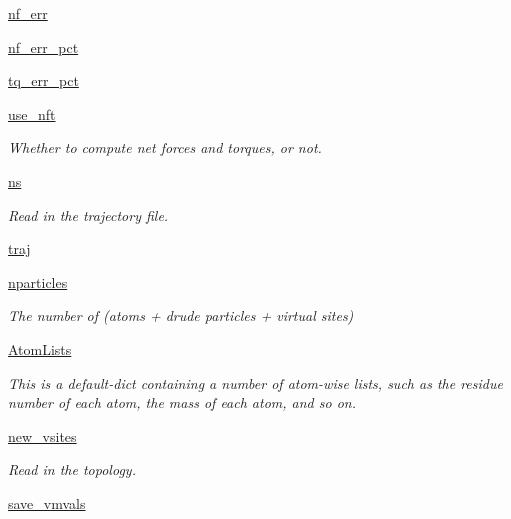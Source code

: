 \begin{DoxyCompactItemize}
\hyperlink{classforcebalance_1_1abinitio_1_1AbInitio_a89de620e9aa500481c9e1ded99e14f72}{nf\-\_\-err}
\item 
\hyperlink{classforcebalance_1_1abinitio_1_1AbInitio_a184edac2cb27a999c363595ea59d8163}{nf\-\_\-err\-\_\-pct}
\item 
\hyperlink{classforcebalance_1_1abinitio_1_1AbInitio_a184f2a783b2710f6f75842afdeccf14e}{tq\-\_\-err\-\_\-pct}
\item 
\hyperlink{classforcebalance_1_1abinitio_1_1AbInitio_afd8d179560a295ffa6c6309843c59279}{use\-\_\-nft}
\begin{DoxyCompactList}\small\item\em Whether to compute net forces and torques, or not. \end{DoxyCompactList}\item 
\hyperlink{classforcebalance_1_1abinitio_1_1AbInitio_a1e8248e2efe952362b1b21462a70b540}{ns}
\begin{DoxyCompactList}\small\item\em Read in the trajectory file. \end{DoxyCompactList}\item 
\hyperlink{classforcebalance_1_1abinitio_1_1AbInitio_a7b52d5101bfa4fde7129c84c0558ad14}{traj}
\item 
\hyperlink{classforcebalance_1_1abinitio_1_1AbInitio_aef3798e4666b91ecc4c526b679eb4908}{nparticles}
\begin{DoxyCompactList}\small\item\em The number of (atoms + drude particles + virtual sites) \end{DoxyCompactList}\item 
\hyperlink{classforcebalance_1_1abinitio_1_1AbInitio_a7e62a74e820ac0c5dd67f49155b95c41}{Atom\-Lists}
\begin{DoxyCompactList}\small\item\em This is a default-\/dict containing a number of atom-\/wise lists, such as the residue number of each atom, the mass of each atom, and so on. \end{DoxyCompactList}\item 
\hyperlink{classforcebalance_1_1abinitio_1_1AbInitio_a64f1aeadac4d7b09424c20b83e5ad5af}{new\-\_\-vsites}
\begin{DoxyCompactList}\small\item\em Read in the topology. \end{DoxyCompactList}\item 
\hyperlink{classforcebalance_1_1abinitio_1_1AbInitio_a22037bf43728fa45f387390005e0b131}{save\-\_\-vmvals}

\end{DoxyCompactItemize}
